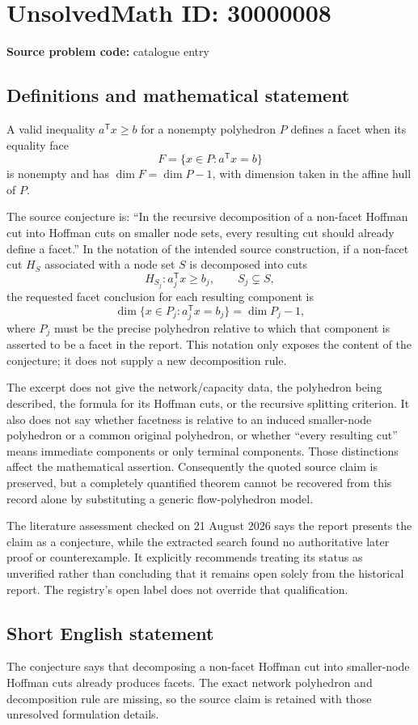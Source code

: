 \documentclass[11pt]{article}
\begin{document}
\section*{UnsolvedMath ID: 30000008}
\textbf{Source problem code:} catalogue entry
\subsection{Definitions and mathematical statement}
A valid inequality $a^\mathsf T x\ge b$ for a nonempty polyhedron $P$ defines a facet when its equality face
\[
 F=\{x\in P:a^\mathsf T x=b\}
\]
is nonempty and has $\dim F=\dim P-1$, with dimension taken in the affine hull of $P$.

The source conjecture is: ``In the recursive decomposition of a non-facet Hoffman cut into Hoffman cuts on smaller node sets, every resulting cut should already define a facet.'' In the notation of the intended source construction, if a non-facet cut $H_S$ associated with a node set $S$ is decomposed into cuts
\[
 H_{S_j}:a_j^\mathsf T x\ge b_j,\qquad S_j\subsetneq S,
\]
the requested facet conclusion for each resulting component is
\[
 \dim\{x\in P_j:a_j^\mathsf T x=b_j\}=\dim P_j-1,
\]
where $P_j$ must be the precise polyhedron relative to which that component is asserted to be a facet in the report. This notation only exposes the content of the conjecture; it does not supply a new decomposition rule.

The excerpt does not give the network/capacity data, the polyhedron being described, the formula for its Hoffman cuts, or the recursive splitting criterion. It also does not say whether facetness is relative to an induced smaller-node polyhedron or a common original polyhedron, or whether ``every resulting cut'' means immediate components or only terminal components. Those distinctions affect the mathematical assertion. Consequently the quoted source claim is preserved, but a completely quantified theorem cannot be recovered from this record alone by substituting a generic flow-polyhedron model.

The literature assessment checked on 21 August 2026 says the report presents the claim as a conjecture, while the extracted search found no authoritative later proof or counterexample. It explicitly recommends treating its status as unverified rather than concluding that it remains open solely from the historical report. The registry's open label does not override that qualification.
\subsection{Short English statement}
The conjecture says that decomposing a non-facet Hoffman cut into smaller-node Hoffman cuts already produces facets. The exact network polyhedron and decomposition rule are missing, so the source claim is retained with those unresolved formulation details.
\end{document}
